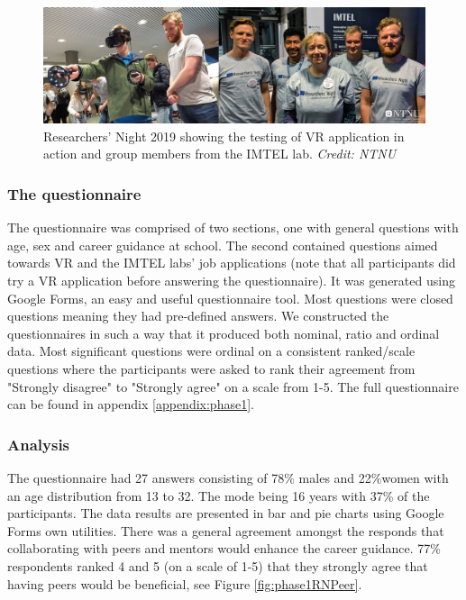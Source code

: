 \begin{figure}[!ht]
    \centering
    \captionsetup{width=.8\linewidth}
    \includegraphics[width=.9\textwidth]{./fig/phase_1/researcherNight/RN_group.jpg}
    \caption{Researchers' Night 2019 showing the testing of VR application in action and group members from the IMTEL lab. \textit{Credit: NTNU}}
    \label{fig:phase1RNGroup}
\end{figure}


\subsubsection{The questionnaire}
The questionnaire was comprised of two sections, one with general questions with age, sex and career guidance at school. The second contained questions aimed towards VR and the IMTEL labs' job applications (note that all participants did try a VR application before answering the questionnaire). It was generated using Google Forms, an easy and useful questionnaire tool. Most questions were closed questions meaning they had pre-defined answers. We constructed the questionnaires in such a way that it produced both nominal, ratio and ordinal data. Most significant questions were ordinal on a consistent ranked/scale questions where the participants were asked to rank their agreement from  "Strongly disagree" to "Strongly agree" on a scale from 1-5. 
The full questionnaire can be found in appendix \ref{appendix:phase1}. 

\subsubsection{Analysis}
The questionnaire had 27 answers consisting of 78\% males and 22\%women with an age distribution from 13 to 32. The mode being 16 years with 37\% of the participants. The data results are presented in bar and pie charts using Google Forms own utilities. There was a general agreement amongst the responds that collaborating with peers and mentors would enhance the career guidance. 77\% respondents ranked 4 and 5 (on a scale of 1-5) that they strongly agree that having peers would be beneficial, see Figure \ref{fig:phase1RNPeer}.    

